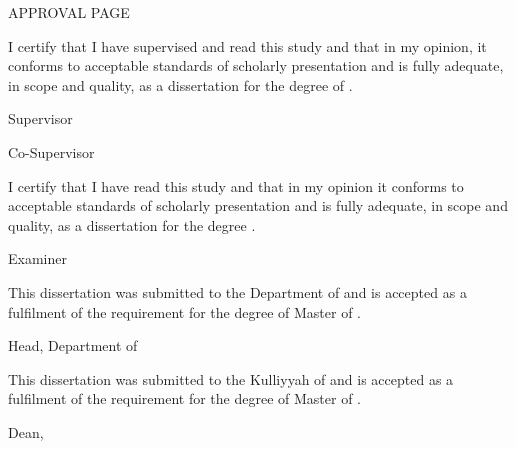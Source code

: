 \documentclass[12pt, a4paper]{memoir}
\begin{document}
\thispagestyle{empty}

\begin{large}
\begin{center}
\MakeUppercase{Approval Page}
\end{center}
\end{large}
\vspace{24pt}
I certify that I have supervised and read this study and that in my opinion, it 
conforms to acceptable standards of scholarly presentation and is fully 
adequate, in scope and quality, as a dissertation for the degree of \myDegree.
\\[24pt]

\hfill \makebox[2in]{\dotfill}

\hfill \mySupervisor

\hfill Supervisor
\\[24pt]


\ifdefined\myCoSupervisor
  \hfill \makebox[2in]{\dotfill}

  \hfill \myCoSupervisor

  \hfill Co-Supervisor\\[24pt]
\fi

\ifdefined\myExaminer
  \noindent I certify that I have read this study and that in my opinion it 
  conforms to acceptable standards of scholarly presentation and is fully 
  adequate, in scope and quality, as a dissertation for the degree 
  \myDegree.\\[24pt]

  \hfill \makebox[2in]{\dotfill}

  \hfill \myExaminer

  \hfill Examiner\\[24pt]
\fi

\ifdefined\myDepartmentHead
  \noindent This dissertation was submitted to the Department of \myDepartment and is accepted as a fulfilment of the requirement for the degree of Master of \mySubject.\\[24pt]

  \hfill \makebox[2in]{\dotfill}

  \hfill \myDepartmentHead

  \hfill Head, Department of \myDepartment\\[24pt]
\fi

\ifdefined\myCoSupervisor
  \ifdefined\myExaminer
    \newpage
  \fi
\fi

\noindent This dissertation was submitted to the Kulliyyah of \myKulliyah and 
is accepted as a fulfilment of the requirement for the degree of Master of 
\mySubject.\\[24pt]

\hfill \makebox[2in]{\dotfill}

\hfill \myKulliyahDean

\hfill Dean, \myKulliyah\\[24pt]
\end{document}
